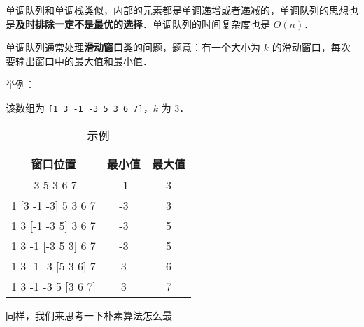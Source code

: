 
单调队列和单调栈类似，内部的元素都是单调递增或者递减的，单调队列的思想也是\textbf{及时排除一定不是最优的选择}．单调队列的时间复杂度也是 $O(n)$．

单调队列通常处理\textbf{滑动窗口}类的问题，题意：有一个大小为 $k$ 的滑动窗口，每次要输出窗口中的最大值和最小值．

举例：

该数组为 \verb|[1 3 -1 -3 5 3 6 7]|，$k$ 为 $3$．

\begin{table}[ht]
\centering
\caption{示例}\label{Mqueue_tab1}
\begin{tabular}{|c|c|c|}
\hline
窗口位置	 & 最小值	 & 最大值 \\
\hline
[1 3 -1] -3 5 3 6 7	 & -1 & 3 \\
\hline
1 [3 -1 -3] 5 3 6 7	 & -3 & 3 \\
\hline
1 3 [-1 -3 5] 3 6 7	 & -3 & 5 \\
\hline
1 3 -1 [-3 5 3] 6 7	 & -3 & 5 \\
\hline
1 3 -1 -3 [5 3 6] 7	 & 3 & 6 \\
\hline
1 3 -1 -3 5 [3 6 7]	 & 3 & 7 \\
\hline
\end{tabular}
\end{table}

同样，我们来思考一下朴素算法怎么最